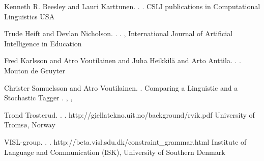 \documentclass[11pt]{article}
\begin{document}
\begin{thebibliography}{}

{Kenneth R. Beesley and Lauri Karttunen}.
.
.
\newblock CSLI publications in Computational Linguistics
\newblock USA

{Trude Heift and Devlan Nicholson}.
.
.
,
\newblock International Journal of Artificial Intelligence in Education

{Fred Karlsson and Atro Voutilainen and Juha Heikkilä and Arto Anttila}.
.
.
\newblock Mouton de Gruyter


{Christer Samuelsson and Atro Voutilainen}.
.
\newblock Comparing a Linguistic and a Stochastic Tagger
.
,
,


{Trond Trosterud}.
.
.
\newblock http://giellatekno.uit.no/background/rvik.pdf
\newblock University of Tromsø, Norway

{VISL-group}.
.
.
\newblock http://beta.visl.sdu.dk/constraint\_grammar.html
\newblock Institute of Language and Communication (ISK), University of Southern Denmark


\end{thebibliography}


%
%



	
\end{document}
